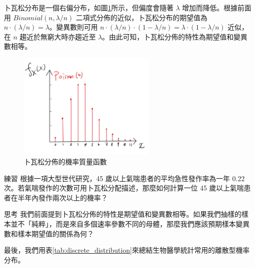     卜瓦松分布是一個右偏分布，如圖\ref{fig:poisson}所示，但偏度會隨著 $\lambda$ 增加而降低。根據前面用 $Binomial(n, \lambda/n)$ 二項式分佈的近似，卜瓦松分布的期望值為 $n \cdot (\lambda/n) = \lambda$。變異數則可用 $n \cdot (\lambda/n) \cdot (1- \lambda/n) = \lambda \cdot (1- \lambda/n)$ 近似，在 $n$ 趨近於無窮大時亦趨近至 $\lambda$。由此可知，卜瓦松分佈的特性為期望值和變異數相等。

    \begin{figure}[htbp]
        \centering
        \includegraphics[width=0.6\textwidth]{figures/03-Probability_distribution/Poisson.jpeg}
        \caption{卜瓦松分佈的機率質量函數}
        \label{fig:poisson}
    \end{figure}

    \bigskip

    \begin{custom}{練習}
        根據一項大型世代研究，45 歲以上氣喘患者的平均急性發作率為一年 0.22 次。若氣喘發作的次數可用卜瓦松分配描述，那麼如何計算一位 45 歲以上氣喘患者在半年內發作兩次以上的機率？
    \end{custom}

    \bigskip

    \begin{custom}{思考}
        我們前面提到卜瓦松分佈的特性是期望值和變異數相等。如果我們抽樣的樣本並不「純粹」，而是來自多個速率參數不同的母體，那麼我們應該預期樣本變異數和樣本期望值的關係為何？
    \end{custom}

    \bigskip

    最後，我們用表\ref{tab:discrete_distribution}來總結生物醫學統計常用的離散型機率分布。
    
